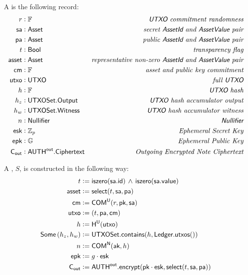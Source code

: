 \begin{definition}
    A \Sender{} is the following record:
    \begin{align*}
        r      &: {\mathbb{F}}                   & \textit{{\textsf{UTXO}}{} commitment randomness} \\
        {\textsf{sa}}    &: {\textsf{Asset}}               & \textit{secret {\textsf{AssetId}}{} and {\textsf{AssetValue}}{} pair} \\
        {\textsf{pa}}    &: {\textsf{Asset}}               & \textit{public {\textsf{AssetId}}{} and {\textsf{AssetValue}}{} pair} \\
        t      &: {\textsf{Bool}}                & \textit{transparency flag} \\
        {\textsf{asset}} &: {\textsf{Asset}}               & \textit{representative non-zero {\textsf{AssetId}}{} and {\textsf{AssetValue}}{} pair} \\
        {\textsf{cm}}    &: {\mathbb{F}}                   & \textit{asset and public key commitment} \\
        {\textsf{utxo}}  &: {\textsf{UTXO}}                & \textit{full {\textsf{UTXO}}{}} \\
        h      &: {\mathbb{F}}                   & \textit{{\textsf{UTXO}}{} hash} \\
        h_z    &: {\textsf{UTXOSet}}.{\textsf{Output}}     & \textit{{\textsf{UTXO}}{} hash accumulator output} \\
        h_w    &: {\textsf{UTXOSet}}.{\textsf{Witness}}    & \textit{{\textsf{UTXO}}{} hash accumulator witness} \\
        n      &: {\textsf{Nullifier}}           & \textit{{\textsf{Nullifier}}{}} \\
        {\textsf{esk}}   &: {\mathbb{Z}}_p                 & \textit{Ephemeral Secret Key} \\
        {\textsf{epk}}   &: {\mathbb{G}}                   & \textit{Ephemeral Public Key} \\
        {\textsf{C}_\textsf{out}}  &: {{\textsf{AUTH}}^\textsf{out}}.{\textsf{Ciphertext}} & \textit{Outgoing Encrypted Note Ciphertext} 
    \end{align*}

    A \Sender{}, $S$, is constructed in the following way:
    \begin{align*}
        t      &:= {\textsf{iszero}}({\textsf{sa}}.{\textsf{id}}) \,\wedge\, {\textsf{iszero}}({\textsf{sa}}.{\textsf{value}}) \\
        {\textsf{asset}} &:= {\textsf{select}}(t, {\textsf{sa}}, {\textsf{pa}}) \\
        {\textsf{cm}}    &:= {\textsf{COM}}^{{\textsf{U}}}(r, {\textsf{pk}}, {\textsf{sa}}) \\
        {\textsf{utxo}}  &:= (t, {\textsf{pa}}, {\textsf{cm}}) \\
        h      &:= {\textsf{H}}^{{\textsf{U}}}({\textsf{utxo}}) \\
        {\textsf{Some}}\left(h_z, h_w\right) &:= {\textsf{UTXOSet}}.{\textsf{contains}}(h, {\textsf{Ledger}}.{\textsf{utxos}}()) \\
        n      &:= {\textsf{COM}}^{{\textsf{N}}}({\textsf{ak}}, h) \\
        {\textsf{epk}}   &:= g \cdot {\textsf{esk}} \\
        {\textsf{C}_\textsf{out}}  &:= {{\textsf{AUTH}}^\textsf{out}}.{\textsf{encrypt}}({\textsf{pk}} \cdot {\textsf{esk}}, {\textsf{select}}(t, {\textsf{sa}}, {\textsf{pa}}))
    \end{align*}
\end{definition}

